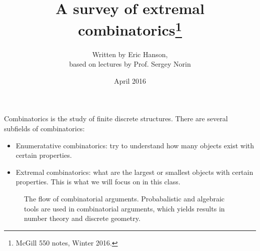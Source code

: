\documentclass[nobib,nohyper,final]{tufte-handout}
\title{A survey of extremal combinatorics\thanks{McGill \smallcaps{MATH} 550 notes, Winter 2016.}\smallskip}%
\author{Written by Eric Hanson,\\based on lectures by Prof. Sergey Norin\smallskip}
\date{April 2016} %
\theoremstyle{definition}
\theoremstyle{remark}
\theoremstyle{plain}
\begin{document}
\setuplayouts


\maketitle%



Combinatorics is the study of finite discrete structures. There are several subfields of combinatorics:
\begin{itemize}
  \item  Enumeratative combinatorics: try to understand how many objects exist with certain properties.
  \item Extremal combinatorics: what are the largest or smallest objects with certain properties. This is what we will focus on in this class.
\end{itemize}
\begin{figure}
\begin{center}
\end{center}
\caption{The flow of combinatorial arguments. Probabalistic and algebraic tools are used in combinatorial arguments, which yields results in number theory and discrete geometry.}
\end{figure}

\tableofcontents


\renewcommand\thesubsection{\Roman{section}.\Roman{subsection}}





\clearpage
\begin{fullwidth}
\printbibliography[heading=fullbib]

\printindex
\end{fullwidth}
\end{document}
